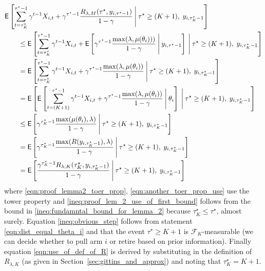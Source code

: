 \begin{myproof}[Proof.]
\begin{align}
	&\E\left[\sum_{t=\tau_K^\star}^{\tau^\star-1} \gamma^{t-1} X_{i,t} + \gamma^{\tau^\star-1} \frac{R_{\lambda,M}(\tau^\star, y_{i,\tau^\star-1})}{1-\gamma}
	\given[\Bigg] \tau^\star \ge (K+1), \;y_{i,\tau^\star_K-1} \right] \nonumber \\
	&\qquad \le  \E\left[\sum_{t=\tau_K^\star}^{\tau^\star-1} \gamma^{t-1} X_{i,t} +  \Ee{ \gamma^{\tau^\star-1}\frac{\max(\lambda,\mu(\theta_i)))}{1-\gamma}\given[\Bigg] y_{i,\tau^\star-1}}
	\given[\Bigg] \tau^\star \ge (K+1), \;y_{i,\tau^\star_K-1} \right] \nonumber\\
	&\qquad = \E\left[\sum_{t=\tau_K^\star}^{\tau^\star-1} \gamma^{t-1} X_{i,t} + \gamma^{\tau^\star-1} \frac{\max(\lambda, \mu(\theta_i))}{1-\gamma}
	\given[\Bigg] \tau^\star \ge (K+1), \;y_{i,\tau^\star_K-1} \right] \label{eqn:another_toer_prop_use}\\
	&\qquad = \E\left[ \Ee{\sum_{t=(K+1)}^{\tau^\star-1} \gamma^{t-1} X_{i,t} + \gamma^{\tau^\star-1}\frac{\max(\lambda,\mu(\theta_i))}{1 - \gamma} \given[\Bigg] \theta_i} 
	\given[\Bigg]\tau^\star \ge (K+1), \; y_{i,\tau^\star_K-1} \right] \label{eqn:proof_lemma2_toer_prop} \\
	&\qquad \le \E\left[ \gamma^{\tau^\star_K - 1} \frac{\max(\mu(\theta_i), \lambda)}{1 - \gamma}\given[\Bigg] \tau^\star \ge (K+1), \; y_{i,\tau^\star_K-1}  \right]  \label{ineq:proof_lem_2_use_of_first_bound} \\
	&\qquad = \E\left[ \gamma^{\tau^\star_K - 1} \frac{\max(R(y_{i,\tau^\star_K-1}), \lambda)}{1 - \gamma}\given[\Bigg] \tau^\star \ge (K+1), \; y_{i,\tau^\star_K-1}  \right]  \label{ineq:obvious_step} \\
	&\qquad = \Ee{\frac{\gamma^{\tau^\star_K-1}R_{\lambda,K}(\tau^\star_K, y_{i,\tau^\star_K-1})}{1-\gamma} \given[\Bigg]  \tau^\star \ge (K+1), \; y_{i,\tau^\star_K-1}} \label{eqn:use_of_def_of_R}
	\end{align}
	where \eqref{eqn:proof_lemma2_toer_prop}, \eqref{eqn:another_toer_prop_use} use the tower property and \eqref{ineq:proof_lem_2_use_of_first_bound} follows from the bound in \eqref{ineq:fundamntal_bound_for_lemma_2} because $\tau^\star_K \le \tau^\star$, almost surely. Equation \eqref{ineq:obvious_step} follows from statement \eqref{eqn:dist_equal_theta_i} and that the event $\tau^\star \ge K + 1$ is $\mathcal{F}_K$-measurable (we can decide whether to pull arm $i$ or retire based on prior information). Finally equation \eqref{eqn:use_of_def_of_R} is derived by substituting in the definition of $R_{\lambda,K}$ (as given in Section~\ref{sec:gittins_and_approx}) and noting that $\tau^\star_K = K+1$.
	

\end{myproof}
